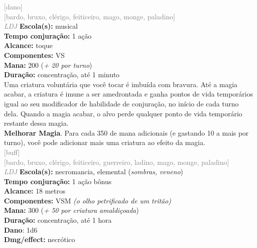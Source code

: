 \documentclass{RPG_Adventure}[2021/10/20]
\begin{document}
{\scriptsize \textcolor{gray}{[dano]\\}}
{\scriptsize \textcolor{gray}{[bardo, bruxo, clérigo, feiticeiro, mago, monge, paladino]\\}}
{\tiny \textcolor{gray}{\textit{LDJ}}}
{\small \t \textbf{Escola(s):} musical\\\t \textbf{Tempo conjuração:} 1 ação\\\t \textbf{Alcance:} toque\\\t \textbf{Componentes:} VS\\\t \textbf{Mana:} 200 (\textit{+ 20 por turno})\\\t \textbf{Duração:} concentração, até 1 minuto\\}
{\normalsize Uma criatura voluntária que você tocar é imbuída com bravura. Até a magia acabar, a criatura é imune a ser amedrontada e ganha pontos de vida temporários igual ao seu modificador de habilidade de conjuração, no início de cada turno dela. Quando a magia acabar, o alvo perde qualquer ponto de vida temporário restante dessa magia.\\\t \textbf{Melhorar Magia}. Para cada 350 de mana adicionais (e gastando 10 a mais por turno), você pode adicionar mais uma criatura ao efeito da magia.\\}
{\scriptsize \textcolor{gray}{[buff]\\}}
{\scriptsize \textcolor{gray}{[bardo, bruxo, clérigo, feiticeiro, guerreiro, ladino, mago, monge, paladino]\\}}
{\tiny \textcolor{gray}{\textit{LDJ}}}
{\small \t \textbf{Escola(s):} necromancia, elemental (\textit{sombras, veneno})\\\t \textbf{Tempo conjuração:} 1 ação bônus\\\t \textbf{Alcance:} 18 metros\\\t \textbf{Componentes:} VSM \textit{(o olho petrificado de um tritão)}\\\t \textbf{Mana:} 300 (\textit{+ 50 por criatura amaldiçoada})\\\t \textbf{Duração:} concentração, até 1 hora\\\t \textbf{Dano}: 1d6\\\t \textbf{Dmg/effect:} necrótico\\}
\end{document}

